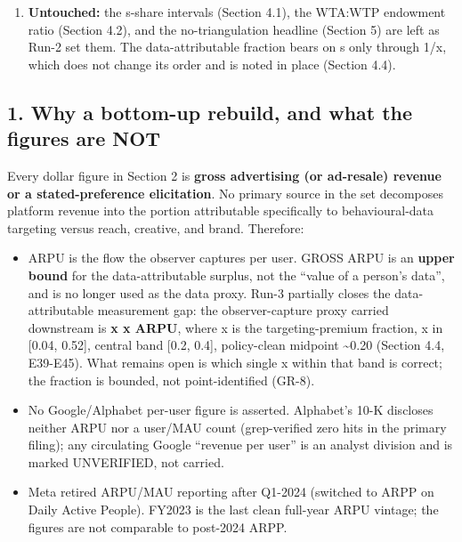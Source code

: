 \documentclass[
  11pt,
]{article}
\providecommand{\tightlist}{%
  \setlength{\itemsep}{0pt}\setlength{\parskip}{0pt}}
\begin{document}
\begin{enumerate}
  collapses entirely, from {[}10\textsuperscript{1,10}5{]} to a
  single-record modelling premium of order \textasciitilde10\^{}0 (the
  word ``super-additive'' is dropped; no figure demonstrates it and E47
  rejects it); the top is now dimensionally clean; the data-attributable
  fraction shaves the central top from \textasciitilde4.5x10\^{}5 to
  \textasciitilde1x10\^{}5. NOT narrowed (and now correctly labelled):
  the raw observer-to-broker gap remains order
  10\textsuperscript{4-10}5, non-identified, but is rent and atomisation
  discount and accumulation, NOT aggregation value (Section 4.3).
\item
  \textbf{Untouched:} the s-share intervals (Section 4.1), the WTA:WTP
  endowment ratio (Section 4.2), and the no-triangulation headline
  (Section 5) are left as Run-2 set them. The data-attributable fraction
  bears on s only through 1/x, which does not change its order and is
  noted in place (Section 4.4).
\end{enumerate}

\subsection{1. Why a bottom-up rebuild, and what the figures are
NOT}\label{why-a-bottom-up-rebuild-and-what-the-figures-are-not}

Every dollar figure in Section 2 is \textbf{gross advertising (or
ad-resale) revenue or a stated-preference elicitation}. No primary
source in the set decomposes platform revenue into the portion
attributable specifically to behavioural-data targeting versus reach,
creative, and brand. Therefore:

\begin{itemize}
\tightlist
\item
  ARPU is the flow the observer captures per user. GROSS ARPU is an
  \textbf{upper bound} for the data-attributable surplus, not the
  ``value of a person's data'', and is no longer used as the data proxy.
  Run-3 partially closes the data-attributable measurement gap: the
  observer-capture proxy carried downstream is \textbf{x x ARPU}, where
  x is the targeting-premium fraction, x in {[}0.04, 0.52{]}, central
  band {[}0.2, 0.4{]}, policy-clean midpoint \textasciitilde0.20
  (Section 4.4, E39-E45). What remains open is which single x within
  that band is correct; the fraction is bounded, not point-identified
  (GR-8).
\item
  No Google/Alphabet per-user figure is asserted. Alphabet's 10-K
  discloses neither ARPU nor a user/MAU count (grep-verified zero hits
  in the primary filing); any circulating Google ``revenue per user'' is
  an analyst division and is marked UNVERIFIED, not carried.
\item
  Meta retired ARPU/MAU reporting after Q1-2024 (switched to ARPP on
  Daily Active People). FY2023 is the last clean full-year ARPU vintage;
  the figures are not comparable to post-2024 ARPP.
\end{itemize}
\end{document}
